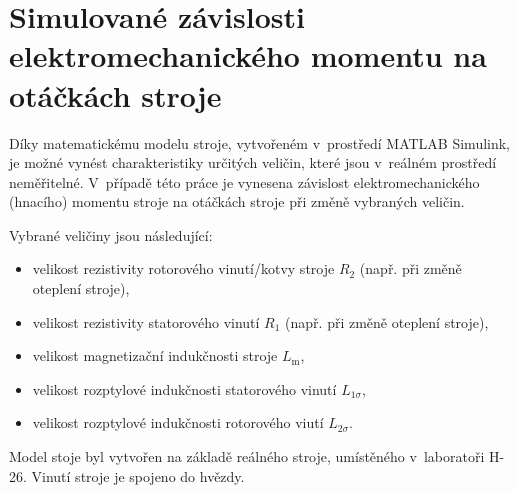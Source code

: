 \documentclass[a4paper, twoside, 11pt]{article}
\begin{document}
\section{Simulované závislosti elektromechanického momentu na otáčkách stroje}
    Díky matematickému modelu stroje, vytvořeném v~prostředí MATLAB Simulink, je možné vynést charakteristiky určitých veličin, které jsou v~reálném prostředí neměřitelné. V~případě této práce je vynesena závislost elektromechanického (hnacího) momentu stroje na otáčkách stroje při změně vybraných veličin.\par
    \vspace*{0.5cm}
    Vybrané veličiny jsou následující:
    \begin{itemize}
        \item velikost rezistivity rotorového vinutí/kotvy stroje $R_2$ (např. při změně oteplení stroje),
        \item velikost rezistivity statorového vinutí $R_1$ (např. při změně oteplení stroje),
        \item velikost magnetizační indukčnosti stroje $L_\text{m}$,
        \item velikost rozptylové indukčnosti statorového vinutí $L_{1\sigma}$,
        \item velikost rozptylové indukčnosti rotorového viutí $L_{2\sigma}$.
    \end{itemize}

    \vspace*{0.5cm}
    \noindent Model stoje byl vytvořen na základě reálného stroje, umístěného v~laboratoři H-26. Vinutí stroje je spojeno do hvězdy.\par
\end{document}
